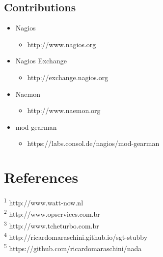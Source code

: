 \documentclass{article}
\begin{document}
\begin{multicols}{2}
\subsection{Contributions}
\begin{itemize}
	\item Nagios
		\begin{itemize}
			\item http://www.nagios.org
		\end{itemize}
	\item Nagios Exchange
		\begin{itemize}
			\item http://exchange.nagios.org
		\end{itemize}
	\item Naemon
		\begin{itemize}
			\item http://www.naemon.org
		\end{itemize}
	\item mod-gearman
		\begin{itemize}
			\item https://labs.consol.de/nagios/mod-gearman
		\end{itemize}
\end{itemize}

\section{References}

\tiny \textsuperscript{1} http://www.watt-now.nl\\
\tiny \textsuperscript{2} http://www.opservices.com.br\\
\tiny \textsuperscript{3} http://www.tcheturbo.com.br\\
\tiny \textsuperscript{4} http://ricardomaraschini.github.io/sgt-stubby\\
\tiny \textsuperscript{5} https://github.com/ricardomaraschini/nada

\end{multicols}
\end{document}
